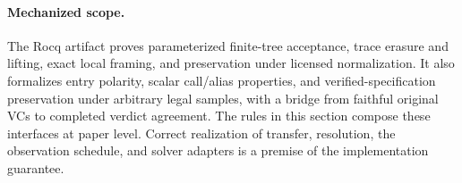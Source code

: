 

\paragraph{Mechanized scope.}
The Rocq artifact proves parameterized finite-tree acceptance, trace
erasure and lifting, exact local framing, and preservation under licensed
normalization. It also formalizes entry polarity, scalar call/alias properties, and
verified-specification preservation under arbitrary legal samples, with a
bridge from faithful original VCs to completed verdict agreement. The rules in this section compose these interfaces at paper
level. Correct realization of transfer, resolution, the observation
schedule, and solver adapters is a premise of the implementation guarantee.
